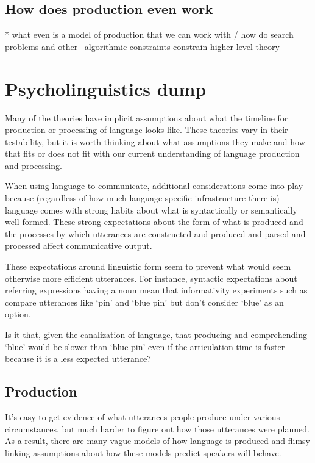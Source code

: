 \documentclass[]{article}
\begin{document}
\subsection{How does production even work}
* what even is a model of production that we can work with / how do search problems and other ~algorithmic constraints constrain higher-level theory


\section{Psycholinguistics dump}

Many of the theories have implicit assumptions about what the timeline for production or processing of language looks like. These theories vary in their testability, but it is worth thinking about what assumptions they make and how that fits or does not fit with our current understanding of language production and processing. 

When using language to communicate, additional considerations come into play because (regardless of how much language-specific infrastructure there is) language comes with strong habits about what is syntactically or semantically well-formed. These strong expectations about the form of what is produced and the processes by which utterances are constructed and produced and parsed and processed affect communicative output.

These expectations around linguistic form seem to prevent what would seem otherwise more efficient utterances. For instance, syntactic expectations about referring expressions having a noun mean that informativity experiments such as \cite{degen20200406} compare utterances like `pin' and `blue pin' but don't consider `blue' as an option. 

Is it that, given the canalization of language, that producing and comprehending `blue' would be slower than `blue pin' even if the articulation time is faster because it is a less expected utterance? 


\subsection{Production}
It's easy to get evidence of what utterances people produce under various circumstances, but much harder to figure out how those utterances were planned. As a result, there are many vague models of how language is produced and flimsy linking assumptions about how these models predict speakers will behave. 
 
\end{document}
